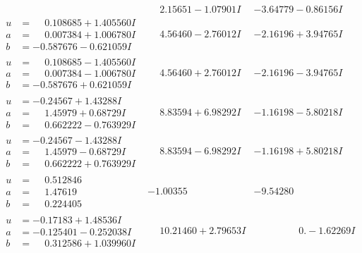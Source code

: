 \documentclass[1p]{elsarticle_modified}
\theoremstyle{definition}
\begin{document}
$$\begin{array}{c|c|c}
 & \phantom{-}2.15651 - 1.07901 I & -3.64779 - 0.86156 I \\ \hline\begin{aligned}
u &= \phantom{-}0.108685 + 1.405560 I \\
a &= \phantom{-}0.007384 + 1.006780 I \\
b &= -0.587676 - 0.621059 I\end{aligned}
 & \phantom{-}4.56460 - 2.76012 I & -2.16196 + 3.94765 I \\ \hline\begin{aligned}
u &= \phantom{-}0.108685 - 1.405560 I \\
a &= \phantom{-}0.007384 - 1.006780 I \\
b &= -0.587676 + 0.621059 I\end{aligned}
 & \phantom{-}4.56460 + 2.76012 I & -2.16196 - 3.94765 I \\ \hline\begin{aligned}
u &= -0.24567 + 1.43288 I \\
a &= \phantom{-}1.45979 + 0.68729 I \\
b &= \phantom{-}0.662222 - 0.763929 I\end{aligned}
 & \phantom{-}8.83594 + 6.98292 I & -1.16198 - 5.80218 I \\ \hline\begin{aligned}
u &= -0.24567 - 1.43288 I \\
a &= \phantom{-}1.45979 - 0.68729 I \\
b &= \phantom{-}0.662222 + 0.763929 I\end{aligned}
 & \phantom{-}8.83594 - 6.98292 I & -1.16198 + 5.80218 I \\ \hline\begin{aligned}
u &= \phantom{-}0.512846\phantom{ +0.000000I} \\
a &= \phantom{-}1.47619\phantom{ +0.000000I} \\
b &= \phantom{-}0.224405\phantom{ +0.000000I}\end{aligned}
 & -1.00355\phantom{ +0.000000I} & -9.54280\phantom{ +0.000000I} \\ \hline\begin{aligned}
u &= -0.17183 + 1.48536 I \\
a &= -0.125401 - 0.252038 I \\
b &= \phantom{-}0.312586 + 1.039960 I\end{aligned}
 & \phantom{-}10.21460 + 2.79653 I & \phantom{-0.000000 } 0. - 1.62269 I \\ \hline\begin{aligned}

\end{aligned}
\end{array}$$
\end{document}
